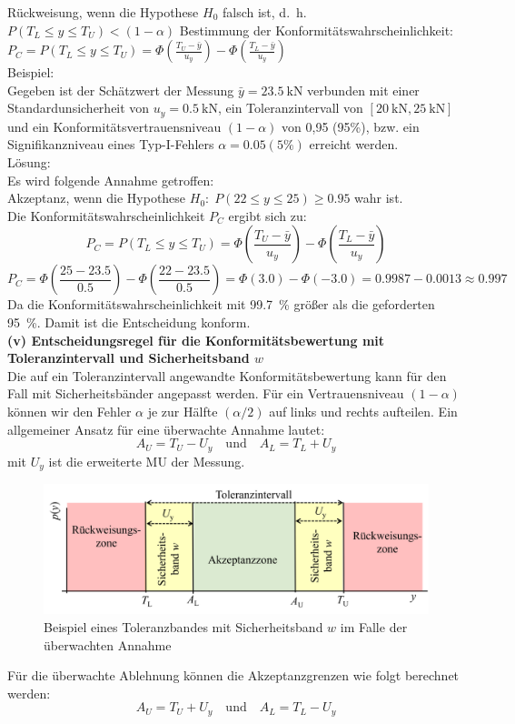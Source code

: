 \hspace*{1em}Rückweisung, wenn die Hypothese $H_0$ falsch ist, d.~h.  $P(T_L \le y \le T_U) < (1 - \alpha)$ \newline
\hspace*{1em} Bestimmung der Konformitätswahrscheinlichkeit: $P_C = P(T_L \le y \le T_U) =  \Phi \left(\frac{T_U - \bar y}{u_y}\right) - \Phi \left(\frac{T_L - \bar y}{u_y}\right)$ \\[2ex]
Beispiel: \\
Gegeben ist der Schätzwert der Messung $\bar y = 23.5~\mathrm{kN}$ verbunden mit einer Standardunsicherheit von $u_y = 0.5~\mathrm{kN}$, ein Toleranzintervall von $[20~\mathrm{kN}, 25~\mathrm{kN}]$ und ein Konformitätsvertrauensniveau $(1 - \alpha)$ von 0,95 (95\%), bzw. ein Signifikanzniveau eines Typ-I-Fehlers $\alpha = 0.05 (5\%)$ erreicht werden. \\
Lösung: \\
Es wird folgende Annahme getroffen:\\
Akzeptanz, wenn die Hypothese $H_0:\; P(22 \le y \le 25) \ge 0.95$ wahr ist.\\
Die Konformitätswahrscheinlichkeit $P_C$ ergibt sich zu: \\
\[
P_C = P(T_L \le y \le T_U) =  \Phi \left(\frac{T_U - \bar y}{u_y}\right) - \Phi \left(\frac{T_L - \bar y}{u_y}\right)
\]
\[
P_C = \Phi \left(\frac{25 - 23.5}{0.5}\right) - \Phi \left(\frac{22 - 23.5}{0.5}\right) = \Phi(3.0) - \Phi(-3.0) = 0.9987 - 0.0013 \approx 0.997
\]
Da die Konformitätswahrscheinlichkeit mit 99.7~\% größer als die geforderten 95~\%. Damit ist die Entscheidung konform.\\[4ex]
\textbf{(v) Entscheidungsregel für die Konformitätsbewertung mit Toleranzintervall und Sicherheitsband $w$} \\
Die auf ein Toleranzintervall angewandte Konformitätsbewertung kann für den Fall mit 
Sicherheitsbänder angepasst werden.
Für ein Vertrauensniveau $(1-\alpha)$ können wir den Fehler $\alpha$ je zur Hälfte $(\alpha/2)$ auf links und rechts aufteilen. Ein allgemeiner Ansatz für eine überwachte Annahme lautet: 
\[
A_U = T_U - U_y  \quad \mathrm{und} \quad A_L = T_L + U_y
\]
mit $U_y$ ist die erweiterte MU der Messung.
\begin{figure}[!htb]	
	\begin{center}
		\includegraphics[width=140mm]{06_vorlesung/media/Toleranzband_mit_Sicherheitsband.png}
		\caption{Beispiel eines Toleranzbandes mit Sicherheitsband $w$ im Falle der überwachten Annahme}
		\label{fig:Beispiel_Toleranzintervall_mit_Sicherheitsband}
	\end{center}
\end{figure}

Für die überwachte Ablehnung können die Akzeptanzgrenzen wie folgt berechnet werden:
\[
A_U = T_U + U_y  \quad \mathrm{und} \quad A_L = T_L - U_y
\]

